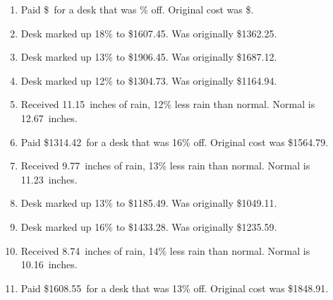 \documentclass[12pt]{amsart}
\begin{document}
\begin{enumerate}
\item Paid \$\paid\ for a desk that was \discount\% off. Original cost was \$\orcost. 
\def \discount{18}\def \paid{1607.45}\def \rainy{14.73}\def \orcost{1960.30}\def \purcost{1362.25}\def \orrainy{17.96}
\item Desk marked up \discount\% to \$\paid. Was originally \$\purcost. 
\def \discount{13}\def \paid{1906.45}\def \rainy{9.24}\def \orcost{2191.32}\def \purcost{1687.12}\def \orrainy{10.62}
\item Desk marked up \discount\% to \$\paid. Was originally \$\purcost. 
\def \discount{12}\def \paid{1304.73}\def \rainy{10.08}\def \orcost{1482.65}\def \purcost{1164.94}\def \orrainy{11.45}
\item Desk marked up \discount\% to \$\paid. Was originally \$\purcost. 
\def \discount{12}\def \paid{1903.07}\def \rainy{11.15}\def \orcost{2162.58}\def \purcost{1699.17}\def \orrainy{12.67}
\item Received \rainy\ inches of rain, \discount\% less rain than normal. Normal is \orrainy\ inches.
\def \discount{16}\def \paid{1314.42}\def \rainy{8.87}\def \orcost{1564.79}\def \purcost{1133.12}\def \orrainy{10.56}
\item Paid \$\paid\ for a desk that was \discount\% off. Original cost was \$\orcost. 
\def \discount{13}\def \paid{1956.83}\def \rainy{9.77}\def \orcost{2249.23}\def \purcost{1731.71}\def \orrainy{11.23}
\item Received \rainy\ inches of rain, \discount\% less rain than normal. Normal is \orrainy\ inches.
\def \discount{13}\def \paid{1185.49}\def \rainy{12.74}\def \orcost{1362.63}\def \purcost{1049.11}\def \orrainy{14.64}
\item Desk marked up \discount\% to \$\paid. Was originally \$\purcost. 
\def \discount{16}\def \paid{1433.28}\def \rainy{12.96}\def \orcost{1706.29}\def \purcost{1235.59}\def \orrainy{15.43}
\item Desk marked up \discount\% to \$\paid. Was originally \$\purcost. 
\def \discount{14}\def \paid{1427.80}\def \rainy{8.74}\def \orcost{1660.23}\def \purcost{1252.46}\def \orrainy{10.16}
\item Received \rainy\ inches of rain, \discount\% less rain than normal. Normal is \orrainy\ inches.
\def \discount{13}\def \paid{1608.55}\def \rainy{10.25}\def \orcost{1848.91}\def \purcost{1423.50}\def \orrainy{11.78}
\item Paid \$\paid\ for a desk that was \discount\% off. Original cost was \$\orcost. 
\def \discount{16}\def \paid{1242.45}\def \rainy{10.87}\def \orcost{1479.11}\def \purcost{1071.08}\def \orrainy{12.94}

\end{enumerate}
\end{document}
